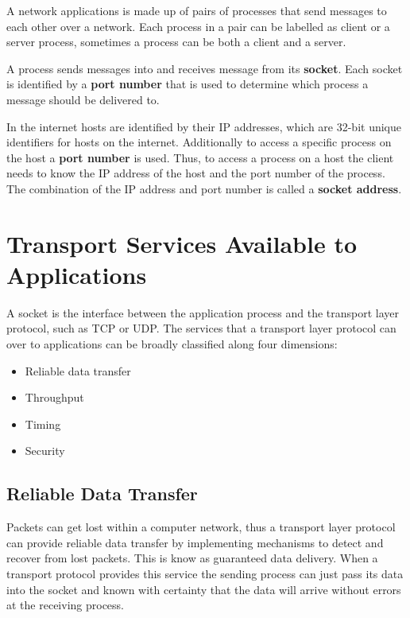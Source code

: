 \documentclass[12pt letter]{report}
\begin{document}

A network applications is made up of pairs of processes that send
messages to each other over a network. Each process in a pair can be
labelled as client or a server process, sometimes a process can be
both a client and a server.

A process sends messages into and receives message from its
\textbf{socket}. Each socket is identified by a \textbf{port number}
that is used to determine which process a message should be delivered to.

In the internet hosts are identified by their IP addresses, which are
32-bit unique identifiers for hosts on the internet. Additionally to
access a specific process on the host a \textbf{port number} is used.
Thus, to access a process on a host the client needs to know the IP
address of the host and the port number of the
process. The combination of the IP address and port number is called
a \textbf{socket address}.

\section{Transport Services Available to Applications}

A socket is the interface between the application process and the
transport layer protocol, such as TCP or UDP.  The services that a
transport layer protocol can over to applications can be broadly
classified along four dimensions:
\begin{itemize}
  \item Reliable data transfer
  \item Throughput
  \item Timing
  \item Security
\end{itemize}

\subsection{Reliable Data Transfer}

Packets can get lost within a computer network, thus a transport
layer protocol can provide reliable data transfer by implementing
mechanisms to detect and recover from lost packets. This is know as
guaranteed data delivery. When a transport protocol provides this
service the sending process can just pass its data into the socket
and known with certainty that the data will arrive without errors at
the receiving process.
\end{document}
